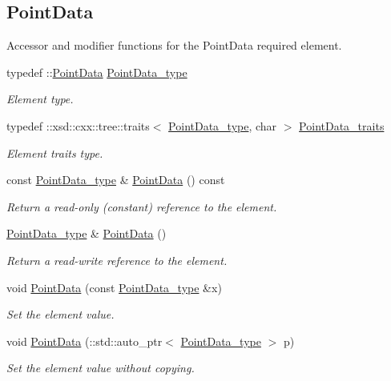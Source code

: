\subsection*{Point\+Data}
\label{_amgrpe540450fb956cd9dbb96f979e5939d0f}%
Accessor and modifier functions for the Point\+Data required element. \begin{DoxyCompactItemize}
\item 
typedef \+::\hyperlink{classPointData}{Point\+Data} \hyperlink{classPieceUnstructuredGrid__t_a5d79d8ea03ca53f80f24e62c2175ec02}{Point\+Data\+\_\+type}
\begin{DoxyCompactList}\small\item\em Element type. \end{DoxyCompactList}\item 
typedef \+::xsd\+::cxx\+::tree\+::traits$<$ \hyperlink{classPieceUnstructuredGrid__t_a5d79d8ea03ca53f80f24e62c2175ec02}{Point\+Data\+\_\+type}, char $>$ \hyperlink{classPieceUnstructuredGrid__t_aee3c7ac7c46c4ebc9f248d31c458d300}{Point\+Data\+\_\+traits}
\begin{DoxyCompactList}\small\item\em Element traits type. \end{DoxyCompactList}\item 
const \hyperlink{classPieceUnstructuredGrid__t_a5d79d8ea03ca53f80f24e62c2175ec02}{Point\+Data\+\_\+type} \& \hyperlink{classPieceUnstructuredGrid__t_a4825627cfe05949b680c81826e9d4ea5}{Point\+Data} () const 
\begin{DoxyCompactList}\small\item\em Return a read-\/only (constant) reference to the element. \end{DoxyCompactList}\item 
\hyperlink{classPieceUnstructuredGrid__t_a5d79d8ea03ca53f80f24e62c2175ec02}{Point\+Data\+\_\+type} \& \hyperlink{classPieceUnstructuredGrid__t_af3a9955626dac2aad17bf879a77d2c0d}{Point\+Data} ()
\begin{DoxyCompactList}\small\item\em Return a read-\/write reference to the element. \end{DoxyCompactList}\item 
void \hyperlink{classPieceUnstructuredGrid__t_aee7745ad1ce39af5fc048e50acb76424}{Point\+Data} (const \hyperlink{classPieceUnstructuredGrid__t_a5d79d8ea03ca53f80f24e62c2175ec02}{Point\+Data\+\_\+type} \&x)
\begin{DoxyCompactList}\small\item\em Set the element value. \end{DoxyCompactList}\item 
void \hyperlink{classPieceUnstructuredGrid__t_a752f5abf0faba70deaab0b4990677612}{Point\+Data} (\+::std\+::auto\+\_\+ptr$<$ \hyperlink{classPieceUnstructuredGrid__t_a5d79d8ea03ca53f80f24e62c2175ec02}{Point\+Data\+\_\+type} $>$ p)
\begin{DoxyCompactList}\small\item\em Set the element value without copying. \end{DoxyCompactList}\end{DoxyCompactItemize}

